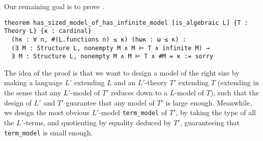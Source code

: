 Our remaining goal is to prove
.

\begin{lstlisting}
theorem has_sized_model_of_has_infinite_model [is_algebraic L] {T : Theory L} {κ : cardinal}
  (hκ : ∀ n, #(L.functions n) ≤ κ) (hωκ : ω ≤ κ) :
  (∃ M : Structure L, nonempty M ∧ M ⊨ T ∧ infinite M) →
  ∃ M : Structure L, nonempty M ∧ M ⊨ T ∧ #M = κ := sorry \end{lstlisting}

The idea of the proof is that we want to design a model of the right size
by making a language $L'$ extending $L$ and an $L'$-theory $T'$ extending $T$
(extending in the sense that any $L'$-model of $T'$ reduces down to a $L$-model of $T$),
such that the design of $L'$ and $T'$ guarantee that any model of $T'$ is large enough.
Meanwhile, we design the most obvious $L'$-model \texttt{term\_model} of $T'$,
by taking the type of all the $L'$-terms, and quotienting by equality deduced by $T'$,
guaranteeing that \texttt{term\_model} is small enough.
